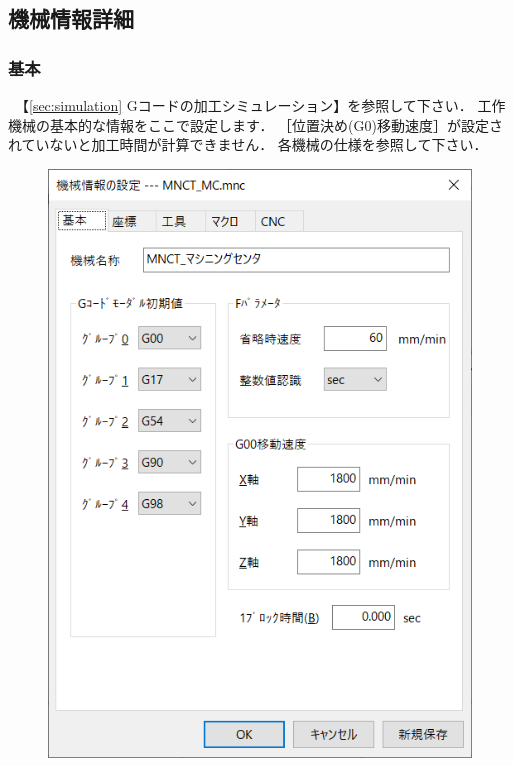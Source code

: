 
\subsection{機械情報詳細}
\label{sec:kikai}

\subsubsection{基本}
\begin{minipage}[t]{0.5\textwidth}
　【\ref{sec:simulation} Gコードの加工シミュレーション】を参照して下さい．
工作機械の基本的な情報をここで設定します．
［位置決め(G0)移動速度］が設定されていないと加工時間が計算できません．
各機械の仕様を参照して下さい．
\end{minipage}
\begin{minipage}[t]{0.5\textwidth}
\vspace*{-2zh}
\begin{figure}[H]
\centering
\includegraphics[scale=0.7]{No6/fig/machine1.png}
\label{fig:machine1.png}
\end{figure}
\end{minipage}

